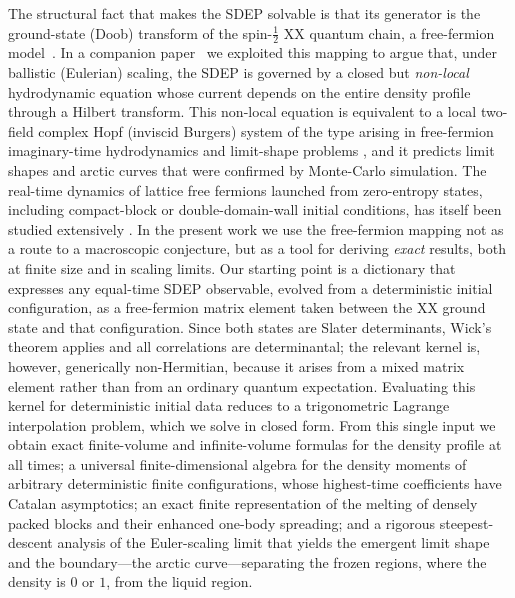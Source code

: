 \documentclass[11pt]{article}
\numberwithin{equation}{section}
\newcommand{\1}{\mathbf 1}
\begin{document}
The structural fact that makes the SDEP solvable is that its generator is the
ground-state (Doob) transform of the spin-$\tfrac12$ XX quantum chain, a
free-fermion model~\cite{LiebSchultzMattis1961,Niemeijer1967}.  In a companion
paper~\cite{ZahraDubailSchutz2025} we exploited this mapping to argue that, under
ballistic (Eulerian) scaling, the SDEP is governed by a closed but
\emph{non-local} hydrodynamic equation whose current depends on the entire
density profile through a Hilbert transform.
This non-local equation is equivalent to a local two-field complex Hopf
(inviscid Burgers) system of the type arising in free-fermion imaginary-time
hydrodynamics and limit-shape problems
\cite{Abanov2006,KenyonOkounkov2007,PallisterGangardtAbanov2022}, and it predicts limit shapes
and arctic curves that were confirmed by Monte-Carlo simulation.
The real-time dynamics of lattice free fermions launched from zero-entropy
states, including compact-block or double-domain-wall initial conditions, has
itself been studied extensively
\cite{AntalRaczRakosSchutz1999,
BettelheimAbanovWiegmann2006,RuggieroBrunDubail2019,
ScopaEtAl2021,ScopaCalabreseDubail2022}.
In the present work we use the free-fermion mapping not as a route to a
macroscopic conjecture, but as a tool for deriving \emph{exact} results, both at
finite size and in scaling limits.  Our starting point is a dictionary that
expresses any equal-time SDEP observable, evolved from a deterministic initial
configuration, as a free-fermion matrix element taken between the XX ground state
and that configuration.  Since both states are Slater determinants, Wick's
theorem applies and all correlations are determinantal; the relevant kernel is,
however, generically non-Hermitian, because it arises from a mixed matrix element
rather than from an ordinary quantum expectation.  Evaluating this kernel for
deterministic initial data reduces to a trigonometric Lagrange interpolation
problem, which we solve in closed form.  From this single input we obtain exact
finite-volume and infinite-volume formulas for the density profile at all times;
a universal finite-dimensional algebra for the density moments of arbitrary
deterministic finite configurations, whose highest-time coefficients have
Catalan asymptotics; an exact finite representation of the melting of densely
packed blocks and their enhanced one-body spreading; and a rigorous
steepest-descent analysis of the Euler-scaling limit that
yields the emergent limit shape and the boundary---the arctic curve---separating
the frozen regions, where the density is $0$ or $1$, from the liquid region.
\end{document}
